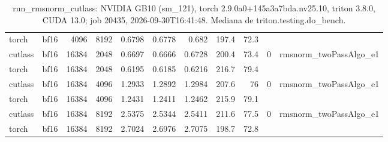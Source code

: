 \begin{table}[htbp]
\begin{tabular}{llrrrrrrrll}
    torch & bf16 & 4096 & 8192 & 0.6798 & 0.6778 & 0.682 & 197.4 & 72.3 &  &  \\
    cutlass & bf16 & 16384 & 2048 & 0.6697 & 0.6666 & 0.6728 & 200.4 & 73.4 & 0 & rmsnorm\_twoPassAlgo\_e1 \\
    torch & bf16 & 16384 & 2048 & 0.6195 & 0.6185 & 0.6216 & 216.7 & 79.4 &  &  \\
    cutlass & bf16 & 16384 & 4096 & 1.2933 & 1.2892 & 1.2984 & 207.6 & 76 & 0 & rmsnorm\_twoPassAlgo\_e1 \\
    torch & bf16 & 16384 & 4096 & 1.2431 & 1.2411 & 1.2462 & 215.9 & 79.1 &  &  \\
    cutlass & bf16 & 16384 & 8192 & 2.5375 & 2.5344 & 2.5411 & 211.6 & 77.5 & 0 & rmsnorm\_twoPassAlgo\_e1 \\
    torch & bf16 & 16384 & 8192 & 2.7024 & 2.6976 & 2.7075 & 198.7 & 72.8 &  &  \\
    \bottomrule
  \end{tabular}
  \caption{run\_rmsnorm\_cutlass: NVIDIA GB10 (sm\_121), torch 2.9.0a0+145a3a7bda.nv25.10, triton 3.8.0, CUDA 13.0; job 20435, 2026-09-30T16:41:48. Mediana de triton.testing.do\_bench.}
  \label{tab:patterson-run-rmsnorm-cutlass}
\end{table}

